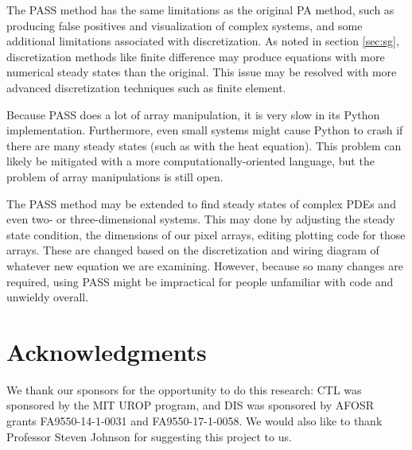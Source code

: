 \documentclass[11pt]{article}
\begin{document}
The PASS method has the same limitations as the original PA method, such as producing false positives and visualization of complex systems, and some additional limitations associated with discretization. As noted in section \cref{sec:sg}, discretization methods like finite difference may produce equations with more numerical steady states than the original. This issue may be resolved with more advanced discretization techniques such as finite element. 

Because PASS does a lot of array manipulation, it is very slow in its Python implementation. Furthermore, even small systems might cause Python to crash if there are many steady states (such as with the heat equation). This problem can likely be mitigated with a more computationally-oriented language, but the problem of array manipulations is still open.

The PASS method may be extended to find steady states of complex PDEs and even two- or three-dimensional systems. This may done by adjusting the steady state condition, the dimensions of our pixel arrays, editing plotting code for those arrays. These are changed based on the discretization and wiring diagram of whatever new equation we are examining. However, because so many changes are required, using PASS might be impractical for people unfamiliar with code and unwieldy overall.

\section{Acknowledgments}

We thank our sponsors for the opportunity to do this research: CTL was sponsored by the MIT UROP program, and DIS was sponsored by AFOSR grants FA9550-14-1-0031 and FA9550-17-1-0058. We would also like to thank Professor Steven Johnson for suggesting this project to us.
\end{document}
